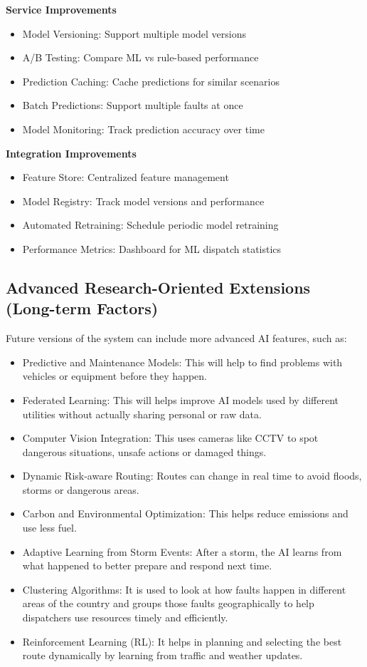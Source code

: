 \textbf{Service Improvements}
\begin{itemize}
    \item Model Versioning: Support multiple model versions
    \item A/B Testing: Compare ML vs rule-based performance
    \item Prediction Caching: Cache predictions for similar scenarios
    \item Batch Predictions: Support multiple faults at once
    \item Model Monitoring: Track prediction accuracy over time
\end{itemize}

\textbf{Integration Improvements}
\begin{itemize}
    \item Feature Store: Centralized feature management
    \item Model Registry: Track model versions and performance
    \item Automated Retraining: Schedule periodic model retraining
    \item Performance Metrics: Dashboard for ML dispatch statistics
\end{itemize}

\subsection{Advanced Research-Oriented Extensions (Long-term Factors)}
Future versions of the system can include more advanced AI features, such as:
\begin{itemize}
    \item Predictive and Maintenance Models: This will help to find problems with vehicles or equipment before they happen.
    \item Federated Learning: This will helps improve AI models used by different utilities without actually sharing personal or raw data.
    \item Computer Vision Integration: This uses cameras like CCTV to spot dangerous situations, unsafe actions or damaged things.
    \item Dynamic Risk-aware Routing: Routes can change in real time to avoid floods, storms or dangerous areas.
    \item Carbon and Environmental Optimization: This helps reduce emissions and use less fuel.
    \item Adaptive Learning from Storm Events: After a storm, the AI learns from what happened to better prepare and respond next time.
    \item Clustering Algorithms: It is used to look at how faults happen in different areas of the country and groups those faults geographically to help dispatchers use resources timely and efficiently.
    \item Reinforcement Learning (RL): It helps in planning and selecting the best route dynamically by learning from traffic and weather updates.
\end{itemize}

